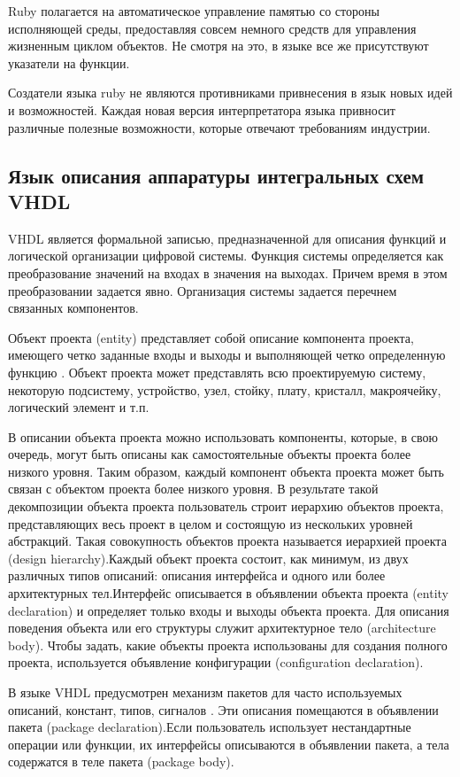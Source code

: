 Ruby полагается на автоматическое управление памятью со стороны исполняющей среды, предоставляя совсем немного средств для управления жизненным циклом объектов.
Не смотря на это, в языке все же присутствуют указатели на функции.

Создатели языка ruby не являются противниками привнесения в язык новых идей и возможностей.
Каждая новая версия интерпретатора языка привносит различные полезные возможности, которые отвечают требованиям индустрии.


\subsection{Язык описания аппаратуры интегральных схем VHDL}
\label{sub:practice:vhdl_overview}
VHDL является формальной записью, предназначенной для описания функций и логической организации цифровой системы. Функция системы определяется как преобразование значений на входах в значения на выходах. Причем время в этом преобразовании задается явно. Организация системы задается перечнем связанных компонентов.

Объект проекта (entity) представляет собой описание компонента проекта, имеющего четко заданные входы и выходы и выполняющей четко определенную функцию \cite{vhdl_entity}. Объект проекта может представлять всю проектируемую систему, некоторую подсистему, устройство, узел, стойку, плату, кристалл, макроячейку, логический элемент и т.п.

В описании объекта проекта можно использовать компоненты, которые, в свою очередь, могут быть описаны как самостоятельные объекты проекта более низкого уровня. Таким образом, каждый компонент объекта проекта может быть связан с объектом проекта более низкого уровня. В результате такой декомпозиции объекта проекта пользователь строит иерархию объектов проекта, представляющих весь проект в целом и состоящую из нескольких уровней абстракций. Такая совокупность объектов проекта называется иерархией проекта (design hierarchy).Каждый объект проекта состоит, как минимум, из двух различных типов описаний: описания интерфейса и одного или более архитектурных тел.Интерфейс описывается в объявлении объекта проекта  (entity declaration)  и определяет только входы и выходы объекта проекта. Для описания поведения объекта или его структуры служит архитектурное тело (architecture body). Чтобы задать, какие объекты проекта использованы для создания полного проекта, используется объявление конфигурации (configuration declaration).

В языке VHDL  предусмотрен механизм пакетов для часто используемых описаний, констант, типов, сигналов \cite{vhdl_packages}. Эти описания помещаются в объявлении пакета (package declaration).Если пользователь использует нестандартные операции или функции, их интерфейсы описываются в объявлении пакета, а тела содержатся в теле пакета (package body).

